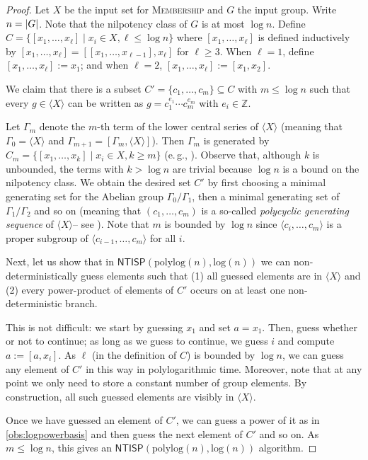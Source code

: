 \documentclass{theoretics}
\newcommand{\algprobm}[1]{\textsc{#1}\xspace}
\newcommand{\Z}{\mathbb{Z}}
\newcommand{\abs}[1]{\left|\mathinner{#1}\right|}
\newcommand*{\ComplexityClass}[1]{\ensuremath{\mathsf{#1}}\xspace}
\newcommand{\NTISP}{\ComplexityClass{NTISP}}
\newcommand{\NTISPpll}{\ensuremath{\NTISP(\mathrm{polylog}(n),\mathrm{log}(n))}\xspace}
\begin{document}
\begin{proof}
 Let $X$ be the input set for \algprobm{Membership} and $G$ the input group. Write $n = \abs{G}$. Note that the nilpotency class of $G$ is at most $\log n$. Define $C = \{[x_1, \dots, x_\ell]\mid x_i \in X, \ell \leq \log n\}$ where $[x_1, \dots, x_\ell]$ is defined inductively by $[x_1, \dots, x_\ell] = [[x_1, \dots, x_{\ell-1}],x_\ell]$ for $\ell \geq 3$. When $\ell = 1$, define $[x_{1}, \ldots, x_{\ell}] := x_{1}$; and when $\ell = 2$, $[x_{1}, \ldots, x_{\ell}] := [x_{1}, x_{2}]$.


We claim that there is a subset $C'= \{c_1, \dots, c_m\} \subseteq C$ with $m \leq \log n$ such that every $g \in \langle X \rangle$ can be written as $g = c_1^{e_1} \cdots c_m^{e_m}$ with $e_i \in \Z$.




Let $\Gamma_m$ denote the $m$-th term of the lower central series of $\langle X \rangle$ (meaning that $\Gamma_0 = \langle X \rangle$ and $\Gamma_{m+1} = [\Gamma_m, \langle X \rangle]$). 
Then $\Gamma_m$ is generated by $C_m = \{[x_1, \dots, x_k]\mid x_i \in X, k\geq m\}$ (e.\,g., \cite[Lemma 2.6]{ClementMZ17}). 
Observe that, although $k$ is unbounded, the terms with $k >\log n$ are trivial because $\log n$ is a bound on the nilpotency class.
We obtain the desired set $C'$ by first choosing a minimal generating set for the Abelian group $\Gamma_0/\Gamma_1$, then a minimal generating set of $\Gamma_1/\Gamma_2$ and so on (meaning that $(c_1, \dots, c_m)$ is a so-called \emph{polycyclic generating sequence} of $\langle X \rangle$-- see \cite[Chapter~8]{Holt2005HandbookOC}). Note that $m$ is bounded by $\log n$ since $\langle c_i, \dots, c_m\rangle$ is a proper subgroup of $\langle c_{i-1}, \dots, c_m\rangle$ for all $i$.

Next, let us show that in \NTISPpll we can non-deterministically guess elements such that (1) all guessed elements are in $\langle X \rangle$ and (2) every power-product of elements of $C'$ occurs on at least one non-deterministic branch. 

This is not difficult: we start by guessing $x_1$ and set $a=x_1$. Then, guess whether or not to continue; as long as we guess to continue, we guess $i$ and compute $a := [a,x_i]$. As $\ell$ (in the definition of $C$) is bounded by $\log n$, we can guess any element of $C'$ in this way in polylogarithmic time. Moreover, note that at any point we only need to store a constant number of group elements. By construction, all such guessed elements are visibly in $\langle X \rangle$.

Once we have guessed an element of $C'$, we can guess a power of it as in  \cref{obs:logpowerbasis} and then guess the next element of $C'$ and so on.
As $m\leq \log n$, this gives an \NTISPpll\xspace algorithm.
\end{proof}
\end{document}
